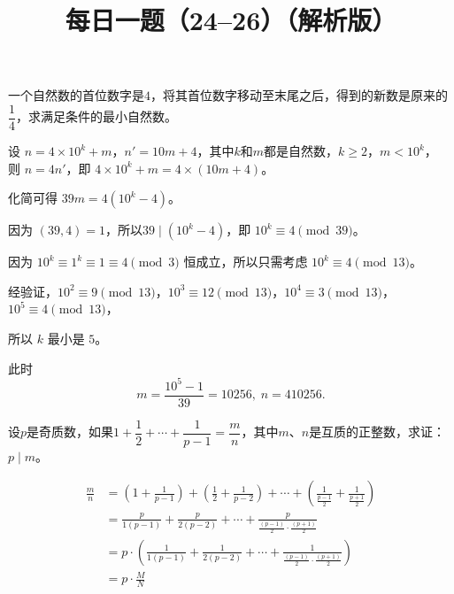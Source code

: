 \documentclass[a4paper,answers]{exam}
\title{\huge \heiti \color{dblue} 每日一题（24--26）（解析版）\\\pgfornament[scale=0.4]{84}}
\author{}
\date{}
\begin{document}
\maketitle

\thispagestyle{headandfoot}


\begin{questions}

\setcounter{question}{23}

\question

一个自然数的首位数字是\(4\)，将其首位数字移动至末尾之后，得到的新数是原来的\(\dfrac{1}{4}\)，求满足条件的最小自然数。

\begin{solution}[\stretch{1}]
    设 \(n = 4 \times 10^k + m\)，\(n' = 10 m + 4\)，其中\(k\)和\(m\)都是自然数，\(k \ge 2\)，\(m < 10^k\)，\\
    则 \(n = 4n'\)，即 \(4 \times 10^k + m = 4 \times \left(10  m + 4\right)\)。\

    化简可得 \(39 m = 4 \left(10^k - 4\right)\)。\

    因为 \(\left(39,4\right) = 1\)，所以\(39 \mid \left(10^k - 4\right)\)，即 \(10^k \equiv 4 \pmod{39}\)。\

    因为 \(10^k \equiv 1^k \equiv 1 \equiv 4 \pmod 3\) 恒成立，所以只需考虑 \(10^k \equiv 4 \pmod{13}\)。\

    经验证，\(10^2 \equiv 9 \pmod{13}\)，\(10^3 \equiv 12 \pmod{13}\)，\(10^4 \equiv 3 \pmod{13}\)，\(10^5 \equiv 4 \pmod{13}\)，

    所以 \(k\) 最小是 \(5\)。\

    此时 \[m = \frac{10^5-1}{39} = 10256,\; n = 410256.\]
\end{solution}

\question

设\(p\)是奇质数，如果\(1+\dfrac{1}{2}+\cdots+\dfrac{1}{p-1}=\dfrac{m}{n}\)，其中\(m\)、\(n\)是互质的正整数，求证：\(p \mid m\)。

\begin{solution}[\stretch{1}]
    \[
        \begin{aligned}
            \frac{m}{n} &= \left(1+\frac{1}{p-1}\right) + \left(\frac{1}{2}+\frac{1}{p-2}\right) + \cdots + \left(\frac{1}{\frac{p-1}{2}}+\frac{1}{\frac{p+1}{2}}\right) \\
            &= \frac{p}{1\left(p-1\right)} + \frac{p}{2\left(p-2\right)}+ \cdots + \frac{p}{\frac{\left(p-1\right)}{2} \cdot \frac{\left(p+1\right)}{2}} \\
            &= p \cdot \left(\frac{1}{1\left(p-1\right)} + \frac{1}{2\left(p-2\right)}+ \cdots + \frac{1}{\frac{\left(p-1\right)}{2} \cdot \frac{\left(p+1\right)}{2}}\right) \\
            &= p \cdot \frac{M}{N}
        \end{aligned}
    \]


\end{solution}
\end{questions}
\end{document}
